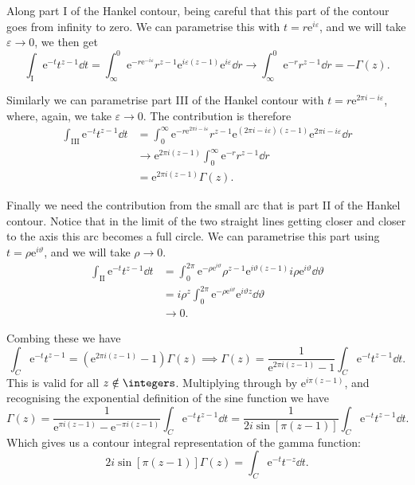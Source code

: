 \documentclass[fleqn]{NotesClass}
\newcommand*{\e}{\mathrm{e}}
\begin{document}
    Along part I of the Hankel contour, being careful that this part of the contour goes from infinity to zero.
    We can parametrise this with \(t = r\e^{i\varepsilon}\), and we will take \(\varepsilon \to 0\), we then get
    \begin{equation}
        \int_{\mathrm{I}} \e^{-t}t^{z-1}\dd{t} = \int_{\infty}^{0} \e^{-r\e^{-i\varepsilon}}r^{z-1}\e^{i\varepsilon(z-1)} \e^{i\varepsilon} \dd{r} \to \int_{\infty}^{0} \e^{-r}r^{z-1} \dd{r} = -\Gamma(z).
    \end{equation}
    
    Similarly we can parametrise part III of the Hankel contour with \(t = r\e^{2\pi i - i\varepsilon}\), where, again, we take \(\varepsilon \to 0\).
    The contribution is therefore
    \begin{align}
        \int_{\mathrm{III}} \e^{-t}t^{z-1}\dd{t} &= \int_{0}^{\infty} \e^{-r\e^{2\pi i - i\varepsilon}}r^{z-1}\e^{(2\pi i - i\varepsilon)(z - 1)}\e^{2\pi i - i\varepsilon}\dd{r}\\
        &\to \e^{2\pi i(z - 1)}\int_{0}^{\infty} \e^{-r}r^{z-1} \dd{r}\\
        &= \e^{2\pi i(z - 1)}\Gamma(z).
    \end{align}
    
    Finally we need the contribution from the small arc that is part II of the Hankel contour.
    Notice that in the limit of the two straight lines getting closer and closer to the axis this arc becomes a full circle.
    We can parametrise this part using \(t = \rho\e^{i\vartheta}\), and we will take \(\rho \to 0\).
    \begin{align}
        \int_{\mathrm{II}} \e^{-t}t^{z - 1} \dd{t} &= \int_{0}^{2\pi} \e^{-\rho\e^{i\vartheta}}\rho^{z-1}\e^{i\vartheta(z - 1)}i\rho\e^{i\vartheta}\dd{\vartheta}\\
        &= i\rho^{z}\int_{0}^{2\pi}\e^{-\rho\e^{i\vartheta}}\e^{i\vartheta z}\dd{\vartheta}\\
        &\to 0.
    \end{align}
    
    Combing these we have
    \begin{equation}
        \int_C \e^{-t}t^{z-1} = (\e^{2\pi i(z - 1)} - 1)\Gamma(z) \implies \Gamma(z) = \frac{1}{\e^{2\pi i (z - 1)} - 1} \int_C \e^{-t}t^{z-1}\dd{t}.
    \end{equation}
    This is valid for all \(z \notin \integers\).
    Multiplying through by \(\e^{i\pi(z-1)}\), and recognising the exponential definition of the sine function we have
    \begin{equation}
        \Gamma(z) = \frac{1}{\e^{\pi i(z - 1)} - \e^{-\pi i(z-1)}}\int_C\e^{-t}t^{z-1}\dd{t} = \frac{1}{2i\sin[\pi(z - 1)]}\int_C\e^{-t}t^{z-1}\dd{t}.
    \end{equation}
    Which gives us a contour integral representation of the gamma function:
    \begin{equation}
        2 i\sin[\pi(z - 1)] \Gamma(z) = \int_C \e^{-t}t^{-z} \dd{t}.
    \end{equation} 
    
\end{document}

